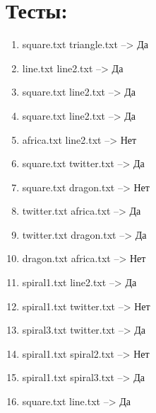 \documentclass{article}
\begin{document}
\section*{Тесты:}

\begin{enumerate}
\item square.txt triangle.txt --> Да
\item line.txt line2.txt --> Да
\item square.txt line2.txt --> Да
\item square.txt line2.txt --> Да
\item africa.txt line2.txt --> Нет
\item square.txt twitter.txt --> Да
\item square.txt dragon.txt --> Нет
\item twitter.txt africa.txt --> Да
\item twitter.txt dragon.txt --> Да
\item dragon.txt africa.txt --> Нет
\item spiral1.txt line2.txt --> Да
\item spiral1.txt twitter.txt --> Нет
\item spiral3.txt twitter.txt --> Да
\item spiral1.txt spiral2.txt --> Нет
\item spiral1.txt spiral3.txt --> Да
\item square.txt line.txt --> Да



\end{enumerate}
\end{document}
